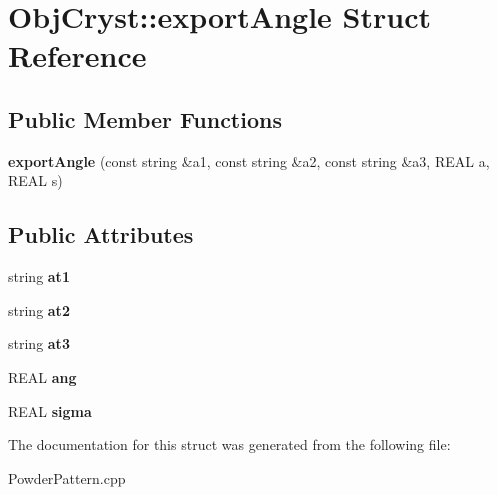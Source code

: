 \hypertarget{struct_obj_cryst_1_1export_angle}{}\section{Obj\+Cryst\+::export\+Angle Struct Reference}
\label{struct_obj_cryst_1_1export_angle}
\subsection*{Public Member Functions}
\begin{DoxyCompactItemize}
\item 
\mbox{\label{struct_obj_cryst_1_1export_angle_a3a2bb20899b160071194d7e251442b92}} 
{\bfseries export\+Angle} (const string \&a1, const string \&a2, const string \&a3, R\+E\+AL a, R\+E\+AL s)
\end{DoxyCompactItemize}
\subsection*{Public Attributes}
\begin{DoxyCompactItemize}
\item 
\mbox{\label{struct_obj_cryst_1_1export_angle_a97d5ac1c2dc1e2a4af0047f963f8e99b}} 
string {\bfseries at1}
\item 
\mbox{\label{struct_obj_cryst_1_1export_angle_ac68ebcebc7343f0b01d6617ed9498017}} 
string {\bfseries at2}
\item 
\mbox{\label{struct_obj_cryst_1_1export_angle_a2c7eca7dd1fe73c4bd46ba0b31694ab8}} 
string {\bfseries at3}
\item 
\mbox{\label{struct_obj_cryst_1_1export_angle_a140fc88697b7b5c386dc43fba082c3cf}} 
R\+E\+AL {\bfseries ang}
\item 
\mbox{\label{struct_obj_cryst_1_1export_angle_a99d093fae5f29824a093993c55a307b3}} 
R\+E\+AL {\bfseries sigma}
\end{DoxyCompactItemize}


The documentation for this struct was generated from the following file\+:\begin{DoxyCompactItemize}
\item 
Powder\+Pattern.\+cpp\end{DoxyCompactItemize}
